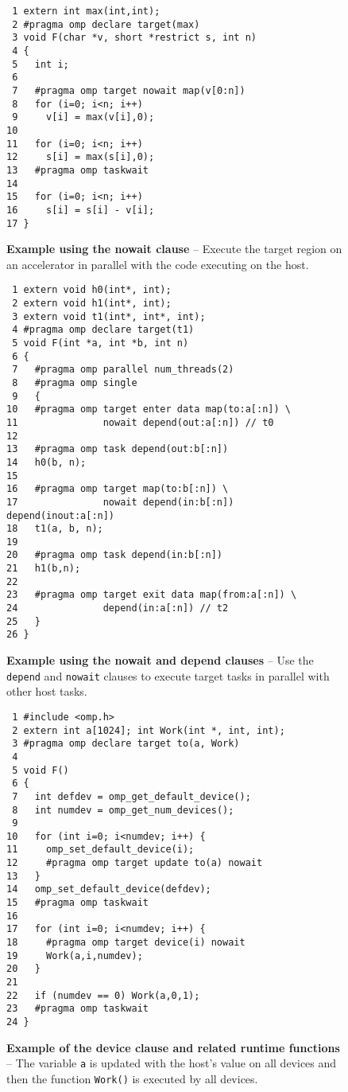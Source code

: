 \begin{figure*}[!tb]
\begin{verbatim}
 1 extern int max(int,int);
 2 #pragma omp declare target(max)
 3 void F(char *v, short *restrict s, int n)
 4 {
 5   int i;
 6 
 7   #pragma omp target nowait map(v[0:n])
 8   for (i=0; i<n; i++)
 9     v[i] = max(v[i],0);
10 
11   for (i=0; i<n; i++)
12     s[i] = max(s[i],0);
13   #pragma omp taskwait
14 
15   for (i=0; i<n; i++)
16     s[i] = s[i] - v[i];
17 }
\end{verbatim}
\caption{ \textbf {Example using the nowait clause } -- \small
          Execute the target region on an accelerator in 
          parallel with the code executing on the host.
         }
\label{figure:chapter6-nowait-v2}
\end{figure*}


\begin{figure*}[!tb]
\begin{verbatim}
 1 extern void h0(int*, int);
 2 extern void h1(int*, int);
 3 extern void t1(int*, int*, int);
 4 #pragma omp declare target(t1)
 5 void F(int *a, int *b, int n)
 6 {
 7   #pragma omp parallel num_threads(2)
 8   #pragma omp single
 9   {
10   #pragma omp target enter data map(to:a[:n]) \
11               nowait depend(out:a[:n]) // t0
12 
13   #pragma omp task depend(out:b[:n])
14   h0(b, n);
15 
16   #pragma omp target map(to:b[:n]) \
17               nowait depend(in:b[:n]) depend(inout:a[:n])
18   t1(a, b, n);
19 
20   #pragma omp task depend(in:b[:n])
21   h1(b,n);
22 
23   #pragma omp target exit data map(from:a[:n]) \
24               depend(in:a[:n]) // t2
25   }
26 }
\end{verbatim}
\caption{ \textbf {Example using the nowait and depend clauses } -- \small
          Use the \texttt{depend} and \texttt{nowait} clauses to execute target
          tasks in parallel with other host tasks.
         }
\label{figure:chapter6-nowait-depend}
\end{figure*}


\begin{figure*}[!tb]
\begin{verbatim}
 1 #include <omp.h>
 2 extern int a[1024]; int Work(int *, int, int);
 3 #pragma omp declare target to(a, Work)
 4 
 5 void F()
 6 {
 7   int defdev = omp_get_default_device();
 8   int numdev = omp_get_num_devices();
 9 
10   for (int i=0; i<numdev; i++) {
11     omp_set_default_device(i);
12     #pragma omp target update to(a) nowait
13   }
14   omp_set_default_device(defdev);
15   #pragma omp taskwait
16 
17   for (int i=0; i<numdev; i++) {
18     #pragma omp target device(i) nowait
19     Work(a,i,numdev);
20   }
21 
22   if (numdev == 0) Work(a,0,1);
23   #pragma omp taskwait
24 }
\end{verbatim}
\caption{ \textbf {Example of the device clause and related runtime functions} -- \small
          The variable \texttt{a} is updated with the host's value on all devices
          and then the function \texttt{Work()} is executed by all devices.
         }
\label{figure:chapter6-device}
\end{figure*}



